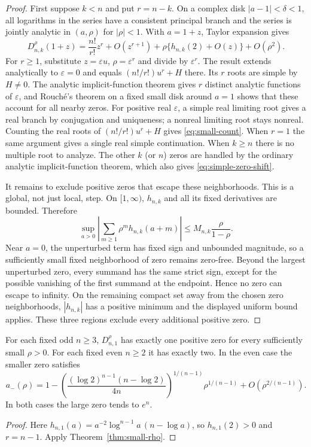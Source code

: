 \begin{proof}
First suppose $k<n$ and put $r=n-k$. On a complex disk $|a-1|<\delta<1$, all logarithms in the series have
a consistent principal branch and the series is jointly analytic in
$(a,\rho)$ for $|\rho|<1$. With $a=1+z$, Taylor expansion gives
\begin{equation}\label{eq:local-unfolding}
 D_{n,k}^{\rho}(1+z)
 =\frac{n!}{r!}z^r+O(z^{r+1})+
     \rho\{h_{n,k}(2)+O(z)\}+O(\rho^2).
\end{equation}
For $r\ge1$, substitute $z=\varepsilon u$, $\rho=\varepsilon^r$
and divide by $\varepsilon^r$. The result extends analytically to
$\varepsilon=0$ and equals $(n!/r!)u^r+H$ there. Its $r$ roots are
simple by $H\ne0$. The analytic implicit-function theorem gives $r$
distinct analytic functions of $\varepsilon$, and Rouch\'e's theorem
on a fixed small disk around $a=1$ shows that these account for all
nearby zeros. For positive real $\varepsilon$, a simple real limiting
root gives a real branch by conjugation and uniqueness; a nonreal
limiting root stays nonreal. Counting the real roots of
$(n!/r!)u^r+H$ gives \eqref{eq:small-count}. When $r=1$ the same
argument gives a single real simple continuation. When $k\ge n$ there
is no multiple root to analyze. The other $k$ (or $n$) zeros are handled
by the ordinary analytic implicit-function theorem, which also gives
\eqref{eq:simple-zero-shift}.

It remains to exclude positive zeros that escape these neighborhoods.
This is a global, not just local, step. On $[1,\infty)$, $h_{n,k}$ and
all its fixed derivatives are bounded. Therefore
\[
 \sup_{a>0}\left|\sum_{m\ge1}\rho^m h_{n,k}(a+m)\right|
 \le M_{n,k}\frac{\rho}{1-\rho}.
\]
Near $a=0$, the unperturbed term has fixed sign and unbounded magnitude,
so a sufficiently small fixed neighborhood of zero remains zero-free.
Beyond the largest unperturbed zero, every summand has the same strict
sign, except for the possible vanishing of the first summand at the
endpoint. Hence no zero can escape to infinity. On the remaining compact
set away from the chosen zero neighborhoods, $|h_{n,k}|$ has a positive
minimum and the displayed uniform bound applies. These three regions
exclude every additional positive zero.
\end{proof}

\begin{corollary}
\label{cor:first-lerch}
For each fixed odd $n\ge3$, $D_{n,1}^{\rho}$ has exactly one positive
zero for every sufficiently small $\rho>0$. For each fixed even $n\ge2$
it has exactly two. In the even case the smaller zero satisfies
\begin{equation}\label{eq:even-small-root}
 a_-(\rho)=1-
 \left(\frac{(\log2)^{n-1}(n-\log2)}{4n}\right)^{1/(n-1)}
 \rho^{1/(n-1)}+O(\rho^{2/(n-1)}).
\end{equation}
In both cases the large zero tends to $e^n$.
\end{corollary}
\begin{proof}
Here
$h_{n,1}(a)=a^{-2}\log^{n-1}a\,(n-\log a)$, so
$h_{n,1}(2)>0$ and $r=n-1$. Apply Theorem~\ref{thm:small-rho}.
\end{proof}

